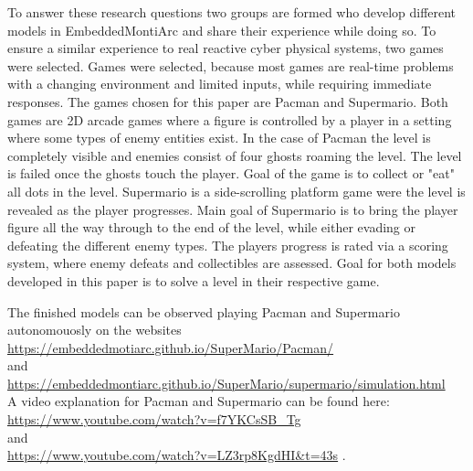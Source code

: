 To answer these research questions two groups are formed who develop different models in EmbeddedMontiArc and share their experience while doing so. To ensure a similar experience to real reactive cyber physical systems, two games were selected.
Games were selected, because most games are real-time problems with a changing environment and limited inputs, while requiring immediate responses.
The games chosen for this paper are Pacman and Supermario.  Both games are 2D arcade games where a figure is controlled by a player in a setting where some types of enemy entities exist. 
In the case of Pacman the level is completely visible and enemies consist of four ghosts roaming the level. The level is failed once the ghosts touch the player. Goal of the game is to collect or "eat" all dots in the level.
Supermario is a side-scrolling platform game were the level is revealed as the player progresses. Main goal of Supermario is to bring the player figure all the way through to the end of the level, while either evading or defeating the different enemy types. The players progress is rated via a scoring system, where enemy defeats and collectibles are assessed.
Goal for both models developed in this paper is to solve a level in their respective game.

The finished models can be observed playing Pacman and Supermario autonomouosly on the websites \\
\url{https://embeddedmotiarc.github.io/SuperMario/Pacman/} \cite{pacmanmodel} \\
and \\
\url{https://embeddedmontiarc.github.io/SuperMario/supermario/simulation.html}
\\

A video explanation for Pacman and Supermario can be found here:
\url{https://www.youtube.com/watch?v=f7YKCsSB_Tg} \cite{pacmanvideo} \\
and \\
\url{https://www.youtube.com/watch?v=LZ3rp8KgdHI&t=43s} \cite{mariovideo}.